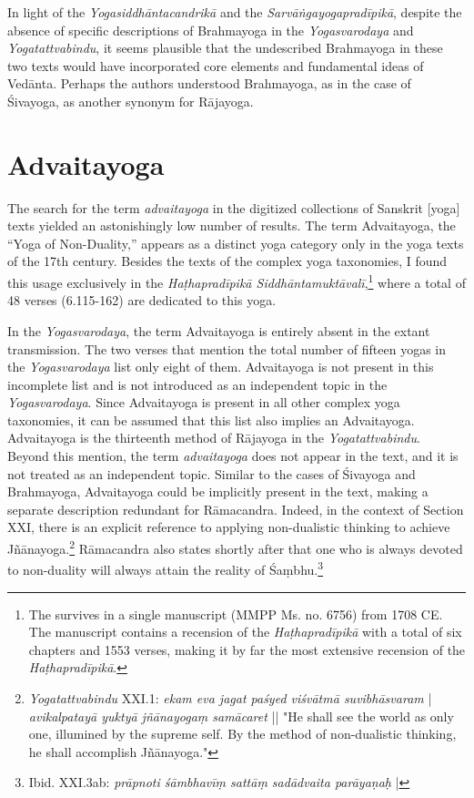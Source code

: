 In light of the \emph{Yogasiddhāntacandrikā} and the \emph{Sarvāṅgayogapradīpikā}, despite the absence of specific descriptions of Brahmayoga in the \emph{Yogasvarodaya} and \emph{Yogatattvabindu}, it seems plausible that the undescribed Brahmayoga in these two texts would have incorporated core elements and fundamental ideas of Vedānta. Perhaps the authors understood Brahmayoga, as in the case of Śivayoga, as another synonym for Rājayoga.

\section{Advaitayoga}
\label{advaitayogaintro}

The search for the term \textit{advaitayoga} in the digitized collections of Sanskrit [yoga] texts yielded an astonishingly low number of results. The term Advaitayoga, the ``Yoga of Non-Duality,'' appears as a distinct yoga category only in the yoga texts of the 17th century. Besides the texts of the complex yoga taxonomies, I found this usage exclusively in the \emph{Haṭhapradīpikā Siddhāntamuktāvalī},\footnote{The  survives in a single manuscript (MMPP Ms. no. 6756) from 1708 CE. The manuscript contains a recension of the \emph{Haṭhapradīpikā} with a total of six chapters and 1553 verses, making it by far the most extensive recension of the \emph{Haṭhapradīpikā}.} where a total of 48 verses (6.115-162) are dedicated to this yoga.

In the \textit{Yogasvarodaya}, the term Advaitayoga is entirely absent in the extant transmission. The two verses that mention the total number of fifteen yogas in the \textit{Yogasvarodaya} list only eight of them. Advaitayoga is not present in this incomplete list and is not introduced as an independent topic in the \textit{Yogasvarodaya}. Since Advaitayoga is present in all other complex yoga taxonomies, it can be assumed that this list also implies an Advaitayoga.
Advaitayoga is the thirteenth method of Rājayoga in the \textit{Yogatattvabindu}. Beyond this mention, the term \textit{advaitayoga} does not appear in the text, and it is not treated as an independent topic. Similar to the cases of Śivayoga and Brahmayoga, Advaitayoga could be implicitly present in the text, making a separate description redundant for Rāmacandra. Indeed, in the context of Section XXI, there is an explicit reference to applying non-dualistic thinking to achieve Jñānayoga.\footnote{\textit{Yogatattvabindu} XXI.1: \textit{ekam eva jagat paśyed viśvātmā suvibhāsvaram} | \textit{avikalpatayā yuktyā jñānayogaṃ samācaret} || "He shall see the world as only one, illumined by the supreme self. By the method of non-dualistic thinking, he shall accomplish Jñānayoga."} Rāmacandra also states shortly after that one who is always devoted to non-duality will always attain the reality of Śaṃbhu.\footnote{Ibid. XXI.3ab: \textit{prāpnoti śāmbhavīṃ sattāṃ sadādvaita parāyaṇaḥ} |}

